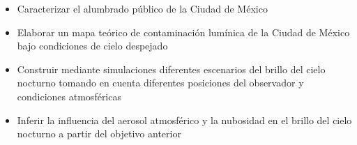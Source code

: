\begin{itemize}

    \item Caracterizar el alumbrado público de la Ciudad de México 
    
    \item Elaborar un mapa teórico de contaminación lumínica de la Ciudad de México bajo condiciones de cielo despejado
    
    \item Construir mediante simulaciones diferentes escenarios del brillo del cielo nocturno tomando en cuenta diferentes posiciones del observador y condiciones atmosféricas
    
    \item Inferir la influencia del aerosol atmosférico  y la nubosidad en el brillo del cielo nocturno a partir del objetivo anterior
    
    
\end{itemize}